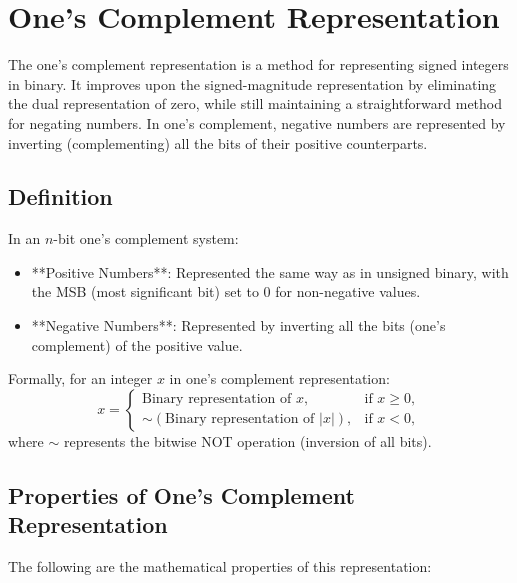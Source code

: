 \section{One's Complement Representation}
The one's complement representation is a method for representing signed integers in binary. It improves upon the signed-magnitude representation by eliminating the dual representation of zero, while still maintaining a straightforward method for negating numbers. In one's complement, negative numbers are represented by inverting (complementing) all the bits of their positive counterparts.

\subsection{Definition}

In an \( n \)-bit one's complement system:
\begin{itemize}
    \item **Positive Numbers**: Represented the same way as in unsigned binary, with the MSB (most significant bit) set to \( 0 \) for non-negative values.
    \item **Negative Numbers**: Represented by inverting all the bits (one's complement) of the positive value.
\end{itemize}

Formally, for an integer \( x \) in one's complement representation:
\[
x =
\begin{cases}
\text{Binary representation of } x, & \text{if } x \geq 0, \\
\sim (\text{Binary representation of } |x|), & \text{if } x < 0,
\end{cases}
\]
where \( \sim \) represents the bitwise NOT operation (inversion of all bits).

\subsection{Properties of One's Complement Representation}

The following are the mathematical properties of this representation:

